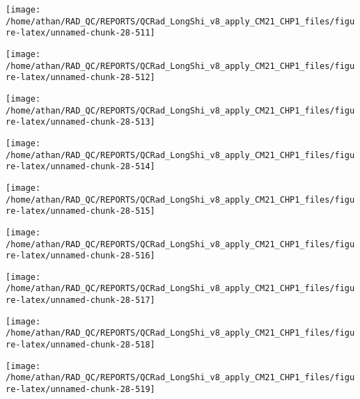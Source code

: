 \documentclass[
  10pt,
  a4paper,oneside]{article}
\begin{document}
\begin{center}\texttt{[image: /home/athan/RAD\_QC/REPORTS/QCRad\_LongShi\_v8\_apply\_CM21\_CHP1\_files/figure-latex/unnamed-chunk-28-511]} \end{center}

\begin{center}\texttt{[image: /home/athan/RAD\_QC/REPORTS/QCRad\_LongShi\_v8\_apply\_CM21\_CHP1\_files/figure-latex/unnamed-chunk-28-512]} \end{center}

\begin{center}\texttt{[image: /home/athan/RAD\_QC/REPORTS/QCRad\_LongShi\_v8\_apply\_CM21\_CHP1\_files/figure-latex/unnamed-chunk-28-513]} \end{center}

\begin{center}\texttt{[image: /home/athan/RAD\_QC/REPORTS/QCRad\_LongShi\_v8\_apply\_CM21\_CHP1\_files/figure-latex/unnamed-chunk-28-514]} \end{center}

\begin{center}\texttt{[image: /home/athan/RAD\_QC/REPORTS/QCRad\_LongShi\_v8\_apply\_CM21\_CHP1\_files/figure-latex/unnamed-chunk-28-515]} \end{center}

\begin{center}\texttt{[image: /home/athan/RAD\_QC/REPORTS/QCRad\_LongShi\_v8\_apply\_CM21\_CHP1\_files/figure-latex/unnamed-chunk-28-516]} \end{center}

\begin{center}\texttt{[image: /home/athan/RAD\_QC/REPORTS/QCRad\_LongShi\_v8\_apply\_CM21\_CHP1\_files/figure-latex/unnamed-chunk-28-517]} \end{center}

\begin{center}\texttt{[image: /home/athan/RAD\_QC/REPORTS/QCRad\_LongShi\_v8\_apply\_CM21\_CHP1\_files/figure-latex/unnamed-chunk-28-518]} \end{center}

\begin{center}\texttt{[image: /home/athan/RAD\_QC/REPORTS/QCRad\_LongShi\_v8\_apply\_CM21\_CHP1\_files/figure-latex/unnamed-chunk-28-519]} \end{center}
\end{document}
